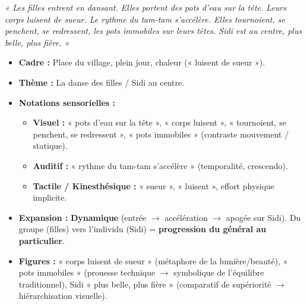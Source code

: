 \documentclass[11pt]{article}
\begin{document}
\begin{exemplebox}
\emph{« Les filles entrent en dansant. Elles portent des pots d'eau sur la tête. Leurs corps luisent de sueur. Le rythme du tam-tam s'accélère. Elles tournoient, se penchent, se redressent, les pots immobiles sur leurs têtes. Sidi est au centre, plus belle, plus fière. »}

\begin{itemize}
    \item \textbf{Cadre :} Place du village, plein jour, chaleur (« luisent de sueur »).
    \item \textbf{Thème :} La danse des filles / Sidi au centre.
    \item \textbf{Notations sensorielles :}
        \begin{itemize}
            \item \textbf{Visuel :} « pots d'eau sur la tête », « corps luisent », « tournoient, se penchent, se redressent », « pots immobiles » (contraste mouvement / statique).
            \item \textbf{Auditif :} « rythme du tam-tam s'accélère » (temporalité, crescendo).
            \item \textbf{Tactile / Kinesthésique :} « sueur », « luisent », effort physique implicite.
        \end{itemize}
    \item \textbf{Expansion :} \textbf{Dynamique} (entrée $\rightarrow$ accélération $\rightarrow$ apogée sur Sidi). Du groupe (filles) vers l'individu (Sidi) = \textbf{progression du général au particulier}.
    \item \textbf{Figures :} « corps luisent de sueur » (métaphore de la lumière/beauté), « pots immobiles » (prouesse technique $\rightarrow$ symbolique de l'équilibre traditionnel), Sidi « plus belle, plus fière » (comparatif de supériorité $\rightarrow$ hiérarchisation visuelle).
\end{itemize}
\end{exemplebox}
\end{document}
